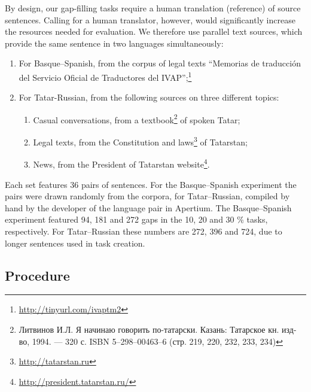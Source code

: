\documentclass[11pt]{article}
\newcommand{\comment}[1]{\marginpar{\scriptsize\sf \textcolor{blue}{#1}}}
\newcommand{\rus}[1]{\foreignlanguage{russian}{#1}}
\begin{document}
By design, our gap-filling tasks require a human translation (reference) of source sentences. Calling for a human translator, however, would significantly increase the resources needed for evaluation. We therefore use parallel text sources, which provide the same sentence in two languages simultaneously:
\begin{enumerate}
\item  For Basque--Spanish, from the corpus of legal texts ``Memorias de traducci\'on del
Servicio Oficial de Traductores del IVAP'';\footnote{\url{http://tinyurl.com/ivaptm2}} 
\item  For Tatar-Russian, from the following sources on three different topics:
  \begin{enumerate}
    \item  Casual conversations, from a textbook\footnote{\rus{Литвинов И.Л. Я начинаю говорить по-татарски. Казань: Татарское кн. изд-во, 1994. — 320 с. ISBN 5--298--00463--6 (стр. 219, 220, 232, 233, 234)}} of spoken Tatar;
    \item  Legal texts, from the Constitution and laws\footnote{\url{http://tatarstan.ru}} of Tatarstan;
    \item  News, from the President of Tatarstan website\footnote{\url{http://president.tatarstan.ru/}}.
  \end{enumerate}
\end{enumerate}

Each set features 36 pairs of sentences. For the Basque--Spanish experiment the pairs were drawn
randomly from the corpora, for Tatar--Russian, compiled by hand by the developer of the
language pair in Apertium. The Basque--Spanish experiment featured 94, 181 and 272 gaps in the 10, 20 and 30 \% tasks, respectively. For Tatar--Russian these numbers are 272, 396 and 724, due to longer sentences used in task creation. \comment{EA to JA: Ilnar wanted to test the system on his own sentences, should I put it in the paper?}

\subsection{Procedure}
\end{document}
